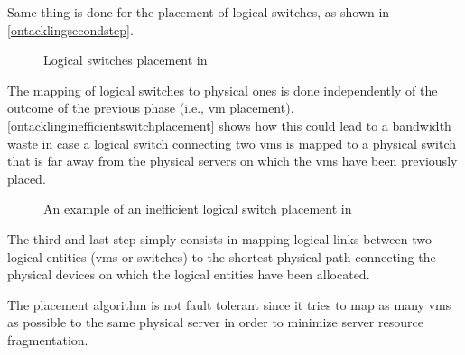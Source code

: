Same thing is done for the placement of logical switches, as shown in \autoref{ontacklingsecondstep}.

\begin{figure}[!htb]
    \centering
    \usebox{\ontacklingsecondstep}
    \caption{Logical switches placement in \cite{ontackling}}
    \label{ontacklingsecondstep}
\end{figure}

The mapping of logical switches to physical ones is done independently of the outcome of the previous phase (i.e., \gls{vm} placement).
\autoref{ontacklinginefficientswitchplacement} shows how this could lead to a bandwidth waste in case a logical switch connecting two \glspl{vm} is mapped to a physical switch that is far away from the physical servers on which the \glspl{vm} have been previously placed.

\begin{figure}[!htb]
    \centering
    \usebox{\ontacklinginefficientswitchplacement}
    \caption{An example of an inefficient logical switch placement in \cite{ontackling}}
    \label{ontacklinginefficientswitchplacement}
\end{figure}

The third and last step simply consists in mapping logical links between two logical entities (\glspl{vm} or switches) to the shortest physical path connecting the physical devices on which the logical entities have been allocated.

The placement algorithm is not fault tolerant since it tries to map as many \glspl{vm} as possible to the same physical server in order to minimize server resource fragmentation.